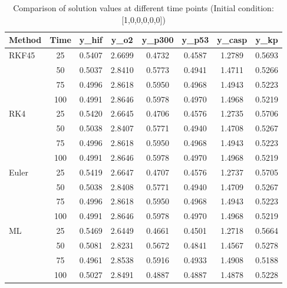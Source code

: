 \documentclass[conference]{IEEEtran}
\begin{document}
\begin{table}[htbp]
\centering
\caption{Comparison of solution values at different time points (Initial condition: [1,0,0,0,0,0])}
\begin{tabular}{lccccccc}
\toprule
\textbf{Method} & \textbf{Time} & \textbf{y\_hif} & \textbf{y\_o2} & \textbf{y\_p300} & \textbf{y\_p53} & \textbf{y\_casp} & \textbf{y\_kp} \\
\midrule
RKF45 & 25  & 0.5407 & 2.6699 & 0.4732 & 0.4587 & 1.2789 & 0.5693 \\
      & 50  & 0.5037 & 2.8410 & 0.5773 & 0.4941 & 1.4711 & 0.5266 \\
      & 75  & 0.4996 & 2.8618 & 0.5950 & 0.4968 & 1.4943 & 0.5223 \\
      & 100 & 0.4991 & 2.8646 & 0.5978 & 0.4970 & 1.4968 & 0.5219 \\
\midrule
RK4   & 25  & 0.5420 & 2.6645 & 0.4706 & 0.4576 & 1.2735 & 0.5706 \\
      & 50  & 0.5038 & 2.8407 & 0.5771 & 0.4940 & 1.4708 & 0.5267 \\
      & 75  & 0.4996 & 2.8618 & 0.5950 & 0.4968 & 1.4943 & 0.5223 \\
      & 100 & 0.4991 & 2.8646 & 0.5978 & 0.4970 & 1.4968 & 0.5219 \\
\midrule
Euler & 25  & 0.5419 & 2.6647 & 0.4707 & 0.4576 & 1.2737 & 0.5705 \\
      & 50  & 0.5038 & 2.8408 & 0.5771 & 0.4940 & 1.4709 & 0.5267 \\
      & 75  & 0.4996 & 2.8618 & 0.5950 & 0.4968 & 1.4943 & 0.5223 \\
      & 100 & 0.4991 & 2.8646 & 0.5978 & 0.4970 & 1.4968 & 0.5219 \\
\midrule
ML    & 25  & 0.5469 & 2.6449 & 0.4661 & 0.4501 & 1.2718 & 0.5664 \\
      & 50  & 0.5081 & 2.8231 & 0.5672 & 0.4841 & 1.4567 & 0.5278 \\
      & 75  & 0.4961 & 2.8538 & 0.5916 & 0.4933 & 1.4908 & 0.5188 \\
      & 100 & 0.5027 & 2.8491 & 0.4887 & 0.4887 & 1.4878 & 0.5228 \\
\bottomrule
\end{tabular}
\label{tab:time_point_comparison}
\end{table}
\end{document}
